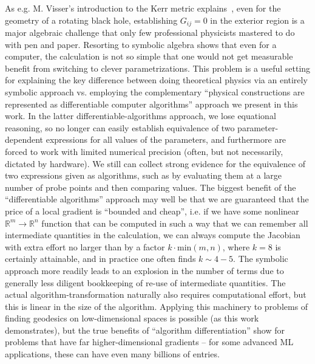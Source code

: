 \documentclass[twocolumn]{article}
\begin{document}
As e.g. M. Visser's introduction to the Kerr metric
explains~\cite{visser2007kerr}, even for the
geometry of a rotating black hole, establishing $G_{ij}=0$ in the
exterior region is a major algebraic challenge that only few
professional physicists mastered to do with pen and paper. Resorting
to symbolic algebra shows that even for a computer, the calculation is
not so simple that one would not get measurable benefit from switching
to clever parametrizations. This problem is a useful setting for
explaining the key difference between doing theoretical physics via an
entirely symbolic approach vs. employing the complementary ``physical
constructions are represented as differentiable computer algorithms''
approach we present in this work. In the latter
differentiable-algorithms approach, we lose equational reasoning, so
no longer can easily establish equivalence of two parameter-dependent
expressions for all values of the parameters, and furthermore are
forced to work with limited numerical precision (often, but not
necessarily, dictated by hardware). We still can collect strong
evidence for the equivalence of two expressions given as algorithms,
such as by evaluating them at a large number of probe points and then
comparing values. The biggest benefit of the ``differentiable
algorithms'' approach may well be that we are guaranteed that the
price of a local gradient is ``bounded and cheap'', i.e. if we have
some nonlinear $\mathbb{R}^m\to\mathbb{R}^n$ function that can be
computed in such a way that we can remember all intermediate
quantities in the calculation, we can always compute the Jacobian with
extra effort no larger than by a factor $k\cdot \text{min}(m, n)$,
where $k=8$ is certainly attainable, and in practice one often finds
$k\sim 4-5$. The symbolic approach more readily leads to an explosion
in the number of terms due to generally less diligent bookkeeping of
re-use of intermediate quantities. The actual algorithm-transformation
naturally also requires computational effort, but this is linear in
the size of the algorithm. Applying this machinery to problems of
finding geodesics on low-dimensional spaces is possible (as this work
demonstrates), but the true benefits of ``algorithm differentiation''
show for problems that have far higher-dimensional gradients -- for
some advanced ML applications, these can have even many billions of
entries.
\end{document}
